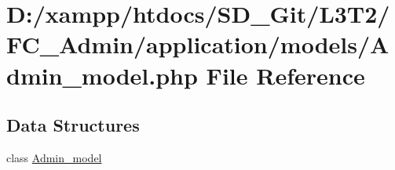 \hypertarget{_admin__model_8php}{}\section{D\+:/xampp/htdocs/\+S\+D\+\_\+\+Git/\+L3\+T2/\+F\+C\+\_\+\+Admin/application/models/\+Admin\+\_\+model.php File Reference}
\label{_admin__model_8php}
\subsection*{Data Structures}
\begin{DoxyCompactItemize}
\item 
class \hyperlink{class_admin__model}{Admin\+\_\+model}
\end{DoxyCompactItemize}
